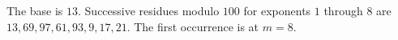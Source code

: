The base is $13$. Successive residues modulo $100$ for exponents $1$ through $8$ are $13,69,97,61,93,9,17,21$. The first occurrence is at $\boxed{m=8}$.
